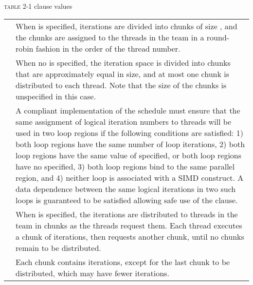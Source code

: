 \pagebreak
\textsc{table 2-1}  clause  values
\vspace{1ex}\renewcommand{\arraystretch}{1.5}
\tablefirsthead{%
\hline\\[-3ex]
}
\tablelasttail{\hline}
\begin{supertabular}{ p{0.8in} p{4.3in} }
 & When  is specified, iterations are divided 
into chunks of size , and the chunks are assigned to the threads in 
the team in a round-robin fashion in the order of the thread number.\\

 & When no  is specified, the iteration space is divided into chunks that 
are approximately equal in size, and at most one chunk is distributed to each 
thread. Note that the size of the chunks is unspecified in this case.\\

 & A compliant implementation of the  schedule must ensure that the 
same assignment of logical iteration numbers to threads will be used in two 
loop regions if the following conditions are satisfied: 1) both loop regions have 
the same number of loop iterations, 2) both loop regions have the same value 
of  specified, or both loop regions have no  specified, 3) 
both loop regions bind to the same parallel region, and 4) neither loop is 
associated with a SIMD construct. A data dependence between the same 
logical iterations in two such loops is guaranteed to be satisfied allowing safe 
use of the  clause.\\

 & When  is specified, the iterations are
distributed to threads in the team in chunks as the threads request them. Each 
thread executes a chunk of iterations, then requests another chunk, until no 
chunks remain to be distributed.\\

 & Each chunk contains  iterations, except for the last chunk to be 
distributed, which may have fewer iterations.\\


\end{supertabular}

